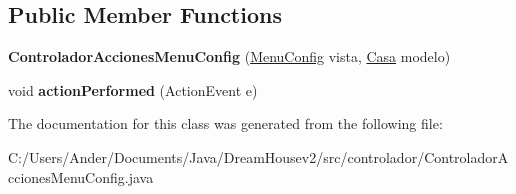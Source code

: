 \subsection*{Public Member Functions}
\begin{DoxyCompactItemize}
\item 
\mbox{\label{classcontrolador_1_1_controlador_acciones_menu_config_a4170bd70b4aec4fdb00586176b624ffe}} 
{\bfseries Controlador\+Acciones\+Menu\+Config} (\mbox{\hyperlink{classvista_1_1_menu_config}{Menu\+Config}} vista, \mbox{\hyperlink{classmodelo_1_1_casa}{Casa}} modelo)
\item 
\mbox{\label{classcontrolador_1_1_controlador_acciones_menu_config_aa3e8635c243c1d61bea4ba8ef3a20f48}} 
void {\bfseries action\+Performed} (Action\+Event e)
\end{DoxyCompactItemize}


The documentation for this class was generated from the following file\+:\begin{DoxyCompactItemize}
\item 
C\+:/\+Users/\+Ander/\+Documents/\+Java/\+Dream\+Housev2/src/controlador/Controlador\+Acciones\+Menu\+Config.\+java\end{DoxyCompactItemize}
